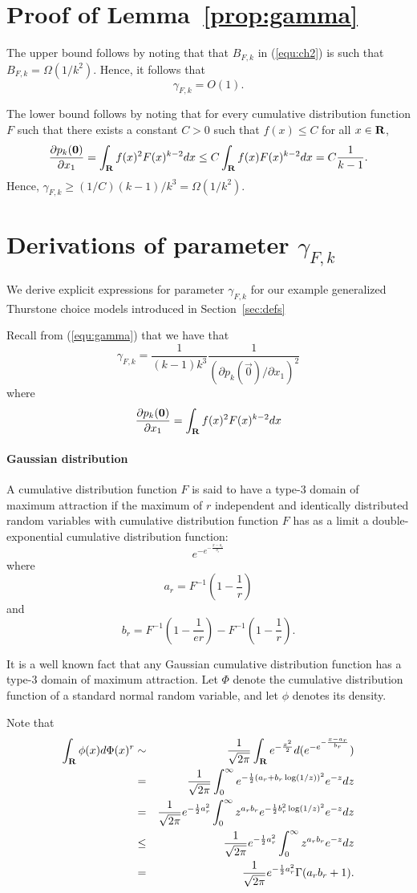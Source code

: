 \section{Proof of Lemma~\ref{prop:gamma}}
\label{sec:gamma}

The upper bound follows by noting that that $B_{F,k}$ in (\ref{equ:ch2}) is such that $B_{F,k} = \Omega(1/k^2)$. Hence, it follows that 
$$
\gamma_{F,k} = O(1).
$$

The lower bound follows by noting that for every cumulative distribution function $F$ such that there exists a constant $C > 0$ such that $f(x) \leq C$ for all $x\in \mathbf{R}$,
$$
\frac{\partial p_k(\mathbf{0})}{\partial x_1} = \int_{\mathbf{R}} f(x)^2 F(x)^{k-2}dx
\leq C \int_{\mathbf{R}} f(x) F(x)^{k-2}dx
= C\frac{1}{k-1}.
$$
Hence, $\gamma_{F,k} \geq (1/C)(k-1)/k^3 = \Omega(1/k^2)$.


\section{Derivations of parameter $\gamma_{F,k}$}

We derive explicit expressions for parameter $\gamma_{F,k}$ for our example generalized Thurstone choice models introduced in Section~\ref{sec:defs}

Recall from (\ref{equ:gamma}) that we have that
$$
\gamma_{F,k} = \frac{1}{(k-1)k^3}\frac{1}{(\partial p_k(\vec{0})/\partial x_1)^2}
$$
where
$$
\frac{\partial p_k(\mathbf{0})}{\partial x_1} = \int_{\mathbf{R}} f(x)^2 F(x)^{k-2}dx
$$


\paragraph{Gaussian distribution} A cumulative distribution function $F$ is said to have a type-3 domain of maximum attraction if the maximum of $r$ independent and identically distributed random variables with cumulative distribution function $F$ has as a limit a double-exponential cumulative distribution function:
$$
e^{-e^{-\frac{x-a_r}{b_r}}}
$$
where
$$
a_r = F^{-1}\left(1-\frac{1}{r}\right)
$$
and
$$
b_r = F^{-1}\left(1-\frac{1}{er}\right) - F^{-1}\left(1-\frac{1}{r}\right).
$$

It is a well known fact that any Gaussian cumulative distribution function has a type-$3$ domain of maximum attraction. Let $\Phi$ denote the cumulative distribution function of a standard normal random variable, and let $\phi$ denotes its density. 

Note that 
\begin{eqnarray*}
\int_{\mathbf{R}} \phi(x) d\Phi(x)^r
&\sim & \frac{1}{\sqrt{2\pi}}\int_{\mathbf{R}} e^{-\frac{x^2}{2}} d(e^{-e^{-\frac{x-a_r}{b_r}}})\\
&=& \frac{1}{\sqrt{2\pi}}\int_0^{\infty} e^{-\frac{1}{2}(a_r + b_r \log(1/z))^2} e^{-z}dz\\
&=& \frac{1}{\sqrt{2\pi}} e^{-\frac{1}{2}a_r^2} \int_0^\infty z^{a_rb_r} e^{-\frac{1}{2}b_r^2 \log(1/z)^2} e^{-z}dz\\
&\leq & \frac{1}{\sqrt{2\pi}} e^{-\frac{1}{2}a_r^2} \int_0^\infty z^{a_rb_r}  e^{-z}dz\\
&=& \frac{1}{\sqrt{2\pi}} e^{-\frac{1}{2}a_r^2} \Gamma(a_r b_r + 1).
\end{eqnarray*}

